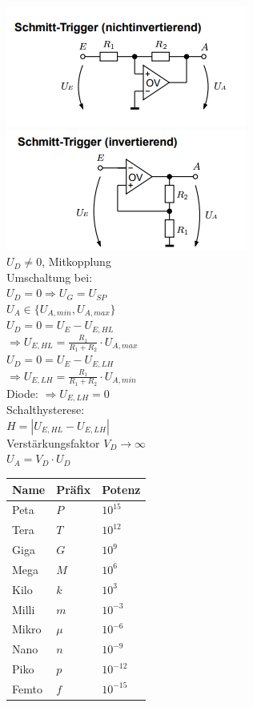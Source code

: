 \documentclass[8pt]{extarticle}
\begin{document}
\begin{minipage}{0.33\textwidth}
\includegraphics[scale=0.40]{NISTOV.png}
\includegraphics[scale=0.40]{ISTOV.png}\\
$U_D \neq 0$, Mitkopplung \\
Umschaltung bei:\\
\phantom{sssi}$U_D = 0 \Rightarrow U_G = U_{SP}$\\
$U_A \in \{ U_{A,min}, U_{A,max} \}$\\
$U_D = 0 = U_E - U_{E,HL}$\\
\phantom{sssi}$\Rightarrow U_{E,HL} = \frac{R_1}{R_1 + R_2} \cdot U_{A,max}$\\
$U_D = 0 = U_E - U_{E,LH}$\\
\phantom{sssi}$\Rightarrow U_{E,LH} = \frac{R_1}{R_1 + R_2} \cdot U_{A,min}$\\
Diode: $\Rightarrow U_{E,LH} = 0$\\
Schalthysterese:\\
\phantom{sssi} $H = |U_{E,HL} - U_{E,LH}|$\\
Verstärkungsfaktor $V_D \to \infty$ \\
\phantom{sssi}$U_A = V_D \cdot U_D$ \\

\begin{tabular}{| l l l |}
	\hline
	Name & Präfix & Potenz\\[0.5ex]
	\hline
	\hline
	Peta & $P$ & $10^{15}$\\
	\hline
	Tera & $T$ & $10^{12}$\\
	\hline
	Giga & $G$ & $10^9$\\
	\hline
	Mega & $M$ & $10^6$\\
	\hline
	Kilo & $k$ & $10^3$\\[0.5ex]
	\hline
	\hline
	Milli & $m$ & $10^{-3}$\\
	\hline
	Mikro & $\mu$ & $10^{-6}$\\
	\hline
	Nano & $n$ & $10^{-9}$\\
	\hline
	Piko & $p$ & $10^{-12}$\\
	\hline
	Femto & $f$ & $10^{-15}$\\
	\hline
\end{tabular}

\end{minipage}%
\end{document}
